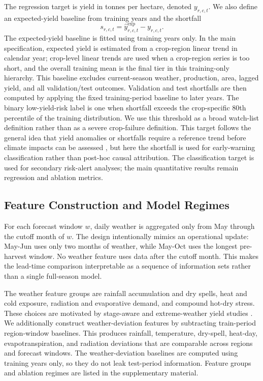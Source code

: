 \documentclass[wcp]{jmlr}
\begin{document}
The regression target is yield in tonnes per hectare, denoted $y_{r,c,t}$. We also define an expected-yield baseline from training years and the shortfall
\[
  s_{r,c,t} = \hat{y}^{\mathrm{exp}}_{r,c,t} - y_{r,c,t}.
\]
The expected-yield baseline is fitted using training years only. In the main specification, expected yield is estimated from a crop-region linear trend in calendar year; crop-level linear trends are used when a crop-region series is too short, and the overall training mean is the final tier in this training-only hierarchy. This baseline excludes current-season weather, production, area, lagged yield, and all validation/test outcomes. Validation and test shortfalls are then computed by applying the fixed training-period baseline to later years. The binary low-yield-risk label is one when shortfall exceeds the crop-specific 80th percentile of the training distribution. We use this threshold as a broad watch-list definition rather than as a severe crop-failure definition. This target follows the general idea that yield anomalies or shortfalls require a reference trend before climate impacts can be assessed \citep{meng2024detrending}, but here the shortfall is used for early-warning classification rather than post-hoc causal attribution. The classification target is used for secondary risk-alert analyses; the main quantitative results remain regression and ablation metrics.

\subsection{Feature Construction and Model Regimes}

For each forecast window $w$, daily weather is aggregated only from May through the cutoff month of $w$. The design intentionally mimics an operational update: May-Jun uses only two months of weather, while May-Oct uses the longest pre-harvest window. No weather feature uses data after the cutoff month. This makes the lead-time comparison interpretable as a sequence of information sets rather than a single full-season model.

The weather feature groups are rainfall accumulation and dry spells, heat and cold exposure, radiation and evaporative demand, and compound hot-dry stress. These choices are motivated by stage-aware and extreme-weather yield studies \citep{schierhorn2021developmentalStages,heino2023hotDryExtremes,heilemann2024lassoExtremes}. We additionally construct weather-deviation features by subtracting train-period region-window baselines. This produces rainfall, temperature, dry-spell, heat-day, evapotranspiration, and radiation deviations that are comparable across regions and forecast windows. The weather-deviation baselines are computed using training years only, so they do not leak test-period information. Feature groups and ablation regimes are listed in the supplementary material.
\end{document}

